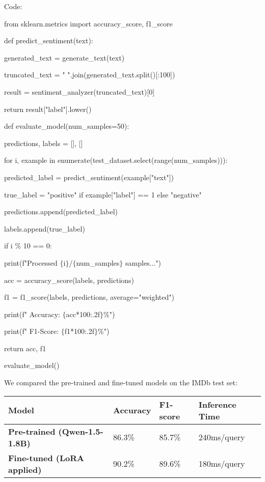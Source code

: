 \documentclass{article} %
\begin{document}
\noindent \begin{flushleft}
Code:

\noindent from sklearn.metrics import accuracy\_score, f1\_score

\noindent def predict\_sentiment(text):

\noindent     generated\_text = generate\_text(text)

\noindent     truncated\_text = " ".join(generated\_text.split()[:100])

\noindent     result = sentiment\_analyzer(truncated\_text)[0]

\noindent     return result["label"].lower()

\noindent def evaluate\_model(num\_samples=50):

\noindent     predictions, labels = [], []

\noindent     for i, example in enumerate(test\_dataset.select(range(num\_samples))):

\noindent         predicted\_label = predict\_sentiment(example["text"])

\noindent         true\_label = "positive" if example["label"] == 1 else "negative"

\noindent         predictions.append(predicted\_label)

\noindent         labels.append(true\_label)

\noindent         if i \% 10 == 0:

\noindent             print(f"Processed $\mathrm{\{}$i$\mathrm{\}}$/$\mathrm{\{}$num\_samples$\mathrm{\}}$ samples...")

\noindent     acc = accuracy\_score(labels, predictions)

\noindent     f1 = f1\_score(labels, predictions, average="weighted")

\noindent     print(f" Accuracy: $\mathrm{\{}$acc*100:.2f$\mathrm{\}}$\%")

\noindent     print(f" F1-Score: $\mathrm{\{}$f1*100:.2f$\mathrm{\}}$\%")

\noindent     return acc, f1

\noindent evaluate\_model()

\noindent 

\noindent We compared the pre-trained and fine-tuned models on the IMDb test set:
\end{flushleft}

\begin{tabular}{|p{1.2in}|p{0.4in}|p{0.4in}|p{0.7in}|} \hline 
\textbf{Model} & \textbf{Accuracy} & \textbf{F1-score} & \textbf{Inference Time} \\ \hline 
\textbf{Pre-trained (Qwen-1.5-1.8B)} & 86.3\% & 85.7\% & 240ms/query \\ \hline 
\textbf{Fine-tuned (LoRA applied)} & 90.2\% & 89.6\% & 180ms/query \\ \hline 
\end{tabular}
\end{document}
